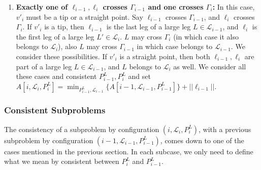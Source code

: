 \documentclass[10pt,a4paper]{amsart}
\theoremstyle{thmstyleone}
\begin{document}
\begin{enumerate}
\begin{enumerate}
        \item \textbf{Exactly one of $\ell_{i-1},\ell_i$ crosses $\Gamma_{i-1}$ and one crosses $\Gamma_i$:}
        In this case, $v'_i$ must be a tip or a straight point. Say $\ell_{i-1}$ crosses $\Gamma_{i-1}$,
        and $\ell_i$ crosses $\Gamma_i$. If $v'_i$ is a tip, then $\ell_{i-1}$ is the last leg of a large leg
        $L\in\mathcal L_{i-1}$, and $\ell_i$ is the first leg of a large leg $L'\in\mathcal L_i$.
        $L$ may cross $\Gamma_i$ (in which case it also belongs to $\mathcal L_i$), also $L$ may cross $\Gamma_{i-1}$ in which case belongs to $\mathcal L_{i-1}$. We consider these possibilities. If $v'_i$ is a straight point, then both $\ell_{i-1},\ell_i$ are part of a large leg $L\in\mathcal L_{i-1}$, and $L$ belongs to $\mathcal L_{i}$ as well. We consider all these cases and consistent $P^L_{i-1},P^L_i$ and set
        $A[i,\mathcal L_i,P^L_i]=\min_{P^L_{i-1},\mathcal L_{i-1}} \{A[i-1,\mathcal L_{i-1},P^L_{i-1}]\}+||\ell_{i-1}||$.
    \end{enumerate} 
\end{enumerate}
\subsubsection*{Consistent Subproblems}\label{def:consistent}
	The consistency of a subproblem by configuration $ (i, \mathcal L_i, P^L_i) $, with a previous subproblem by configuration $ (i-1, \mathcal L_{i - 1}, P^L_{i - 1}) $, comes down to one of the cases mentioned in the previous section. In each subcase, we only need to define what we mean by consistent between $ P^L_i $ and $ P^L_{i - 1} $.
	
\end{document}
